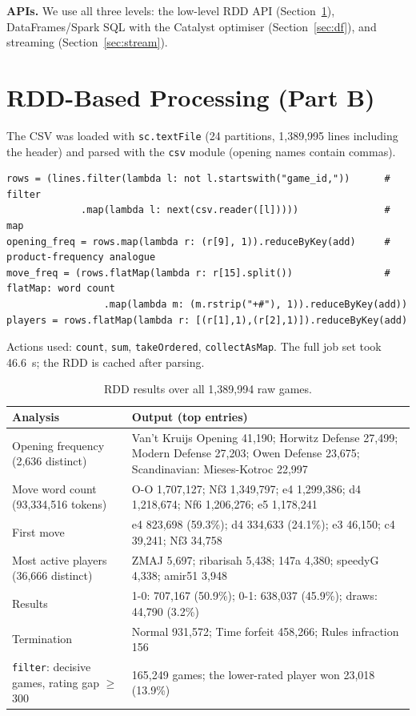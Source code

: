 \documentclass[11pt,a4paper]{article}
\begin{document}
\textbf{APIs.} We use all three levels: the low-level RDD API (Section~\ref{sec:rdd}),
DataFrames/Spark SQL with the Catalyst optimiser (Section~\ref{sec:df}), and streaming
(Section~\ref{sec:stream}).

\section{RDD-Based Processing (Part B)}\label{sec:rdd}
The CSV was loaded with \texttt{sc.textFile} (24 partitions, 1,389,995 lines including
the header) and parsed with the \texttt{csv} module (opening names contain commas).
\begin{lstlisting}
rows = (lines.filter(lambda l: not l.startswith("game_id,"))      # filter
             .map(lambda l: next(csv.reader([l]))))               # map
opening_freq = rows.map(lambda r: (r[9], 1)).reduceByKey(add)     # product-frequency analogue
move_freq = (rows.flatMap(lambda r: r[15].split())                # flatMap: word count
                 .map(lambda m: (m.rstrip("+#"), 1)).reduceByKey(add))
players = rows.flatMap(lambda r: [(r[1],1),(r[2],1)]).reduceByKey(add)
\end{lstlisting}
Actions used: \texttt{count}, \texttt{sum}, \texttt{takeOrdered}, \texttt{collectAsMap}.
The full job set took 46.6~s; the RDD is cached after parsing.

\begin{table}[H]\centering\small
\caption{RDD results over all 1,389,994 raw games.}
\begin{tabular}{@{}p{3.6cm}p{11.8cm}@{}}\toprule
Analysis & Output (top entries)\\\midrule
Opening frequency (2,636 distinct) & Van't Kruijs Opening 41,190; Horwitz Defense 27,499; Modern Defense 27,203; Owen Defense 23,675; Scandinavian: Mieses-Kotroc 22,997\\
Move word count (93,334,516 tokens) & O-O 1,707,127; Nf3 1,349,797; e4 1,299,386; d4 1,218,674; Nf6 1,206,276; e5 1,178,241\\
First move & e4 823,698 (59.3\%); d4 334,633 (24.1\%); e3 46,150; c4 39,241; Nf3 34,758\\
Most active players (36,666 distinct) & ZMAJ 5,697; ribarisah 5,438; 147a 4,380; speedyG 4,338; amir51 3,948\\
Results & 1-0: 707,167 (50.9\%); 0-1: 638,037 (45.9\%); draws: 44,790 (3.2\%)\\
Termination & Normal 931,572; Time forfeit 458,266; Rules infraction 156\\
\texttt{filter}: decisive games, rating gap $\ge$300 & 165,249 games; the lower-rated player won 23,018 (13.9\%)\\\bottomrule
\end{tabular}\end{table}
\end{document}
